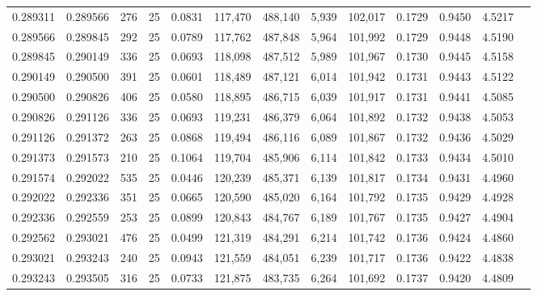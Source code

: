\begin{tabular}{rrrrrrrrrrrrr}
0.289311 & 0.289566 &   276 &  25 &                                     0.0831 & 117,470 & 488,140 &   5,939 & 102,017 & 0.1729 & 0.9450 & 4.5217 \\
0.289566 & 0.289845 &   292 &  25 &                                     0.0789 & 117,762 & 487,848 &   5,964 & 101,992 & 0.1729 & 0.9448 & 4.5190 \\
0.289845 & 0.290149 &   336 &  25 &                                     0.0693 & 118,098 & 487,512 &   5,989 & 101,967 & 0.1730 & 0.9445 & 4.5158 \\
0.290149 & 0.290500 &   391 &  25 &                                     0.0601 & 118,489 & 487,121 &   6,014 & 101,942 & 0.1731 & 0.9443 & 4.5122 \\
0.290500 & 0.290826 &   406 &  25 &                                     0.0580 & 118,895 & 486,715 &   6,039 & 101,917 & 0.1731 & 0.9441 & 4.5085 \\
0.290826 & 0.291126 &   336 &  25 &                                     0.0693 & 119,231 & 486,379 &   6,064 & 101,892 & 0.1732 & 0.9438 & 4.5053 \\
0.291126 & 0.291372 &   263 &  25 &                                     0.0868 & 119,494 & 486,116 &   6,089 & 101,867 & 0.1732 & 0.9436 & 4.5029 \\
0.291373 & 0.291573 &   210 &  25 &                                     0.1064 & 119,704 & 485,906 &   6,114 & 101,842 & 0.1733 & 0.9434 & 4.5010 \\
0.291574 & 0.292022 &   535 &  25 &                                     0.0446 & 120,239 & 485,371 &   6,139 & 101,817 & 0.1734 & 0.9431 & 4.4960 \\
0.292022 & 0.292336 &   351 &  25 &                                     0.0665 & 120,590 & 485,020 &   6,164 & 101,792 & 0.1735 & 0.9429 & 4.4928 \\
0.292336 & 0.292559 &   253 &  25 &                                     0.0899 & 120,843 & 484,767 &   6,189 & 101,767 & 0.1735 & 0.9427 & 4.4904 \\
0.292562 & 0.293021 &   476 &  25 &                                     0.0499 & 121,319 & 484,291 &   6,214 & 101,742 & 0.1736 & 0.9424 & 4.4860 \\
0.293021 & 0.293243 &   240 &  25 &                                     0.0943 & 121,559 & 484,051 &   6,239 & 101,717 & 0.1736 & 0.9422 & 4.4838 \\
0.293243 & 0.293505 &   316 &  25 &                                     0.0733 & 121,875 & 483,735 &   6,264 & 101,692 & 0.1737 & 0.9420 & 4.4809 \\

\end{tabular}

